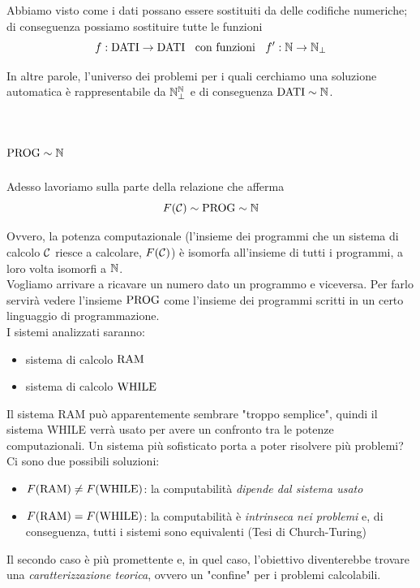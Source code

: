 Abbiamo visto come i dati possano essere sostituiti da delle codifiche numeriche; di conseguenza possiamo sostituire tutte le funzioni 
$$ f: \text{DATI} \rightarrow \text{DATI} \;\; \text{ con funzioni } \;\; f': \mathbb{N} \rightarrow \mathbb{N}_\bot $$

In altre parole, l'universo dei problemi per i quali cerchiamo una soluzione automatica è rappresentabile da $\mathbb{N}_\bot^{\mathbb{N}}$ e di conseguenza $\text{DATI} \sim \mathbb{N}$.\\

\section{$\text{PROG} \sim \mathbb{N}$}
Adesso lavoriamo sulla parte della relazione che afferma 
$$ F(\mathcal{C}) \sim \text{PROG} \sim \mathbb{N} $$

Ovvero, la potenza computazionale (l'insieme dei programmi che un sistema di calcolo $\mathcal{C}$ riesce a calcolare, $F(\mathcal{C})$) è isomorfa all'insieme di tutti i programmi, a loro volta isomorfi a $\mathbb{N}$.\\

Vogliamo arrivare a ricavare un numero dato un programmo e viceversa. Per farlo servirà vedere l'insieme $\text{PROG}$ come l'insieme dei programmi scritti in un certo linguaggio di programmazione.\\

I sistemi analizzati saranno: 
\begin{itemize}
	\item sistema di calcolo $\text{RAM}$
	\item sistema di calcolo $\text{WHILE}$
\end{itemize}

Il sistema RAM può apparentemente sembrare "troppo semplice", quindi il sistema WHILE verrà usato per avere un confronto tra le potenze computazionali. Un sistema più sofisticato porta a poter risolvere più problemi? \\

Ci sono due possibili soluzioni: 
\begin{itemize}
	\item $F(\text{RAM}) \neq F(\text{WHILE})$: la computabilità \textit{dipende dal sistema usato}
	\item $F(\text{RAM}) = F(\text{WHILE})$: la computabilità è \textit{intrinseca nei problemi} e, di conseguenza, tutti i sistemi sono equivalenti (Tesi di Church-Turing)
\end{itemize}

Il secondo caso è più promettente e, in quel caso, l'obiettivo diventerebbe trovare una \textit{caratterizzazione teorica}, ovvero un "confine" per i problemi calcolabili.\\

